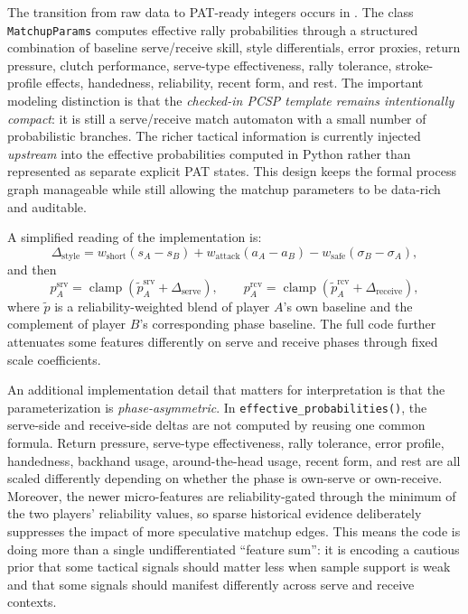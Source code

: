 \documentclass{article}
\begin{document}
The transition from raw data to PAT-ready integers occurs in . The class \texttt{MatchupParams} computes effective rally probabilities through a structured combination of baseline serve/receive skill, style differentials, error proxies, return pressure, clutch performance, serve-type effectiveness, rally tolerance, stroke-profile effects, handedness, reliability, recent form, and rest. The important modeling distinction is that the \emph{checked-in PCSP template remains intentionally compact}: it is still a serve/receive match automaton with a small number of probabilistic branches. The richer tactical information is currently injected \emph{upstream} into the effective probabilities computed in Python rather than represented as separate explicit PAT states. This design keeps the formal process graph manageable while still allowing the matchup parameters to be data-rich and auditable.

A simplified reading of the implementation is:
\[
\Delta_{\text{style}} =
w_{\text{short}}(s_A-s_B) +
w_{\text{attack}}(a_A-a_B) -
w_{\text{safe}}(\sigma_B-\sigma_A),
\]
and then
\[
p^{\text{srv}}_A = \operatorname{clamp}(\tilde{p}^{\text{srv}}_A + \Delta_{\text{serve}}),
\qquad
p^{\text{rcv}}_A = \operatorname{clamp}(\tilde{p}^{\text{rcv}}_A + \Delta_{\text{receive}}),
\]
where \(\tilde{p}\) is a reliability-weighted blend of player \(A\)'s own baseline and the complement of player \(B\)'s corresponding phase baseline. The full code further attenuates some features differently on serve and receive phases through fixed scale coefficients.

An additional implementation detail that matters for interpretation is that the parameterization is \emph{phase-asymmetric}. In \texttt{effective\_probabilities()}, the serve-side and receive-side deltas are not computed by reusing one common formula. Return pressure, serve-type effectiveness, rally tolerance, error profile, handedness, backhand usage, around-the-head usage, recent form, and rest are all scaled differently depending on whether the phase is own-serve or own-receive. Moreover, the newer micro-features are reliability-gated through the minimum of the two players' reliability values, so sparse historical evidence deliberately suppresses the impact of more speculative matchup edges. This means the code is doing more than a single undifferentiated ``feature sum'': it is encoding a cautious prior that some tactical signals should matter less when sample support is weak and that some signals should manifest differently across serve and receive contexts.
\end{document}
